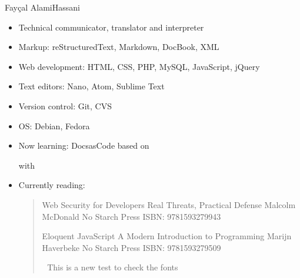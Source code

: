 \documentclass[a4paper,10pt,english,openany,oneside]{sphinxmanual}
\begin{document}
\sphinxAtStartPar
Fayçal Alami\sphinxhyphen{}Hassani \sphinxhyphen{} %
\begin{footnote}[1]\sphinxAtStartFootnote
{}
%
\end{footnote} \sphinxhyphen{} %
\begin{footnote}[2]\sphinxAtStartFootnote
{}
%
\end{footnote}
\begin{itemize}
\item {} 
\sphinxAtStartPar
Technical communicator, translator and interpreter

\item {} 
\sphinxAtStartPar
Markup: reStructuredText, Markdown, DocBook, XML

\item {} 
\sphinxAtStartPar
Web development: HTML, CSS, PHP, MySQL, JavaScript, jQuery

\item {} 
\sphinxAtStartPar
Text editors: Nano, Atom, Sublime Text

\item {} 
\sphinxAtStartPar
Version control: Git, CVS

\item {} 
\sphinxAtStartPar
OS: Debian, Fedora

\item {} 
\sphinxAtStartPar
Now learning: Docs\sphinxhyphen{}as\sphinxhyphen{}Code based on %
\begin{footnote}[3]\sphinxAtStartFootnote
{}
%
\end{footnote} with %
\begin{footnote}[4]\sphinxAtStartFootnote
{}
%
\end{footnote}

\item {} 
\sphinxAtStartPar
Currently reading:
\begin{quote}

\sphinxAtStartPar
{} Web Security for Developers \sphinxhyphen{} Real Threats, Practical Defense \sphinxhyphen{} Malcolm McDonald \sphinxhyphen{} No Starch Press \sphinxhyphen{} ISBN: 978\sphinxhyphen{}1\sphinxhyphen{}59327\sphinxhyphen{}994\sphinxhyphen{}3

\sphinxAtStartPar
{} Eloquent JavaScript \sphinxhyphen{} A Modern Introduction to Programming \sphinxhyphen{} Marijn Haverbeke \sphinxhyphen{} No Starch Press \sphinxhyphen{} ISBN: 978\sphinxhyphen{}1\sphinxhyphen{}59327950\sphinxhyphen{}9

\sphinxAtStartPar
📕 This is a new test to check the fonts
\end{quote}

\end{itemize}
\end{document}
